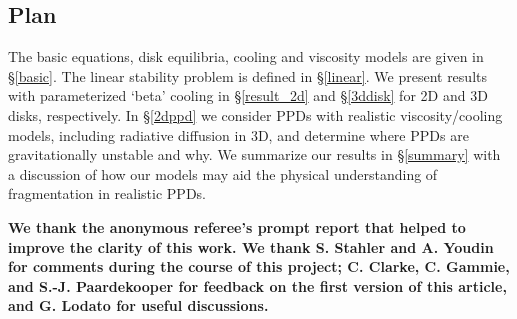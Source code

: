 \documentclass[iop, numberedappendix]{emulateapj}
\begin{document}
\subsection{Plan}\label{plan}

The basic equations, disk equilibria, cooling and viscosity models are 
given in \S\ref{basic}. The linear stability problem is defined in 
\S\ref{linear}. We present results with parameterized `beta' cooling in 
\S\ref{result_2d} and \S\ref{3ddisk} for 2D and 3D disks,
respectively. %
In \S\ref{2dppd} we consider PPDs with realistic viscosity/cooling   
models, including radiative diffusion in 3D, and determine where PPDs
are gravitationally unstable and why. We summarize our results in
\S\ref{summary} with a discussion of how our models may aid the 
physical understanding of fragmentation in realistic PPDs.   





 



{\bf
We thank the anonymous referee's prompt report that helped to improve
the clarity of this work. We thank S. Stahler and A. Youdin for
comments during the  course of this project; C. Clarke,
C. Gammie, and S.-J. Paardekooper for feedback on the first version of
this article, and G. Lodato for useful discussions.  
}

\appendix




\end{document}
